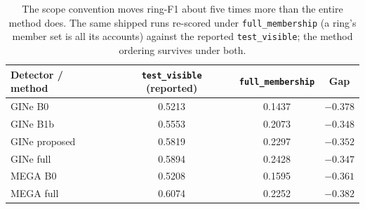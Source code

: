 \begin{table}[t]
\centering
\caption{The scope convention moves ring-F1 about five times more than the entire method does.
The same shipped runs re-scored under \texttt{full\_membership} (a ring's member set is all its
accounts) against the reported \texttt{test\_visible}; the method ordering survives under both.}
\label{tab:scope}
\small
\begin{tabular}{lccc}
\toprule
Detector / method & \texttt{test\_visible} (reported) & \texttt{full\_membership} & Gap \\
\midrule
GINe B0 & 0.5213 & 0.1437 & $-0.378$ \\ %
GINe B1b & 0.5553 & 0.2073 & $-0.348$ \\ %
GINe proposed & 0.5819 & 0.2297 & $-0.352$ \\ %
GINe full & 0.5894 & 0.2428 & $-0.347$ \\ %
MEGA B0 & 0.5208 & 0.1595 & $-0.361$ \\ %
MEGA full & 0.6074 & 0.2252 & $-0.382$ \\ %
\bottomrule
\end{tabular}
\end{table}
